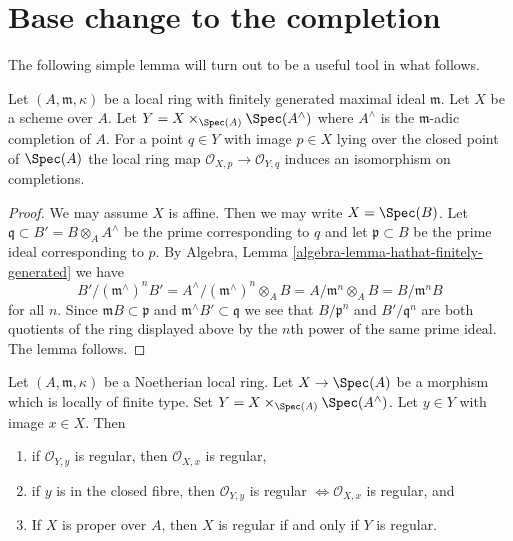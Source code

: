 \section{Base change to the completion}
\label{section-aux}

\noindent
The following simple lemma will turn out to be a useful tool in what follows.

\begin{lemma}
\label{lemma-iso-completions}
Let $(A, \mathfrak m, \kappa)$ be a local ring with finitely generated
maximal ideal $\mathfrak m$. Let $X$ be a scheme over $A$.
Let $Y = X \times_{\Spec(A)} \Spec(A^\wedge)$ where
$A^\wedge$ is the $\mathfrak m$-adic completion of $A$.
For a point $q \in Y$ with image $p \in X$ lying
over the closed point of $\Spec(A)$ the
local ring map $\mathcal{O}_{X, p} \to \mathcal{O}_{Y, q}$
induces an isomorphism on completions.
\end{lemma}

\begin{proof}
We may assume $X$ is affine. Then we may write $X = \Spec(B)$.
Let $\mathfrak q \subset B' = B \otimes_A A^\wedge$ be the
prime corresponding to $q$ and let $\mathfrak p \subset B$
be the prime ideal corresponding to $p$.
By Algebra, Lemma \ref{algebra-lemma-hathat-finitely-generated}
we have
$$
B'/(\mathfrak m^\wedge)^n B' =
A^\wedge/(\mathfrak m^\wedge)^n \otimes_A B =
A/\mathfrak m^n \otimes_A B = B/\mathfrak m^n B
$$
for all $n$. Since $\mathfrak m B \subset \mathfrak p$ and
$\mathfrak m^\wedge B' \subset \mathfrak q$ we see that
$B/\mathfrak p^n$ and $B'/\mathfrak q^n$ are both
quotients of the ring displayed above by the $n$th power
of the same prime ideal. The lemma follows.
\end{proof}

\begin{lemma}
\label{lemma-port-regularity-to-completion}
Let $(A, \mathfrak m, \kappa)$ be a Noetherian local ring.
Let $X \to \Spec(A)$ be a morphism which is locally of finite type.
Set $Y = X \times_{\Spec(A)} \Spec(A^\wedge)$. Let $y \in Y$ with
image $x \in X$. Then
\begin{enumerate}
\item if $\mathcal{O}_{Y, y}$ is regular, then $\mathcal{O}_{X, x}$
is regular,
\item if $y$ is in the closed fibre, then $\mathcal{O}_{Y, y}$ is regular
$\Leftrightarrow \mathcal{O}_{X, x}$ is regular, and
\item If $X$ is proper over $A$, then $X$ is regular
if and only if $Y$ is regular.
\end{enumerate}
\end{lemma}

